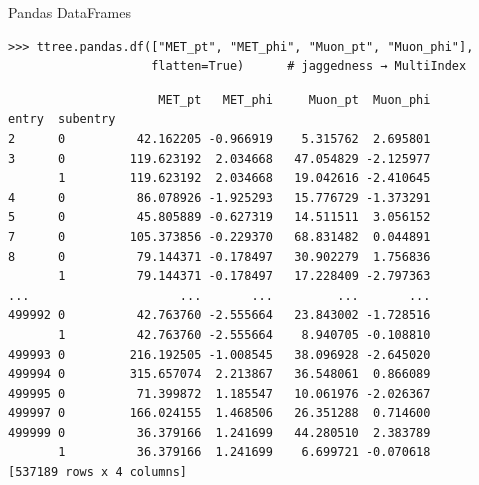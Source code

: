 \documentclass[aspectratio=169]{beamer}
\begin{document}
\begin{frame}[fragile]{Pandas DataFrames}
\small
\begin{verbatim}
>>> ttree.pandas.df(["MET_pt", "MET_phi", "Muon_pt", "Muon_phi"],
                    flatten=True)      # jaggedness → MultiIndex
\end{verbatim}
\scriptsize\color{darkblue}\vspace{-0.75\baselineskip}\begin{verbatim}
                     MET_pt   MET_phi     Muon_pt  Muon_phi
entry  subentry                                            
2      0          42.162205 -0.966919    5.315762  2.695801
3      0         119.623192  2.034668   47.054829 -2.125977
       1         119.623192  2.034668   19.042616 -2.410645
4      0          86.078926 -1.925293   15.776729 -1.373291
5      0          45.805889 -0.627319   14.511511  3.056152
7      0         105.373856 -0.229370   68.831482  0.044891
8      0          79.144371 -0.178497   30.902279  1.756836
       1          79.144371 -0.178497   17.228409 -2.797363
...                     ...       ...         ...       ...
499992 0          42.763760 -2.555664   23.843002 -1.728516
       1          42.763760 -2.555664    8.940705 -0.108810
499993 0         216.192505 -1.008545   38.096928 -2.645020
499994 0         315.657074  2.213867   36.548061  0.866089
499995 0          71.399872  1.185547   10.061976 -2.026367
499997 0         166.024155  1.468506   26.351288  0.714600
499999 0          36.379166  1.241699   44.280510  2.383789
       1          36.379166  1.241699    6.699721 -0.070618
[537189 rows x 4 columns]
\end{verbatim}
\end{frame}
\end{document}
